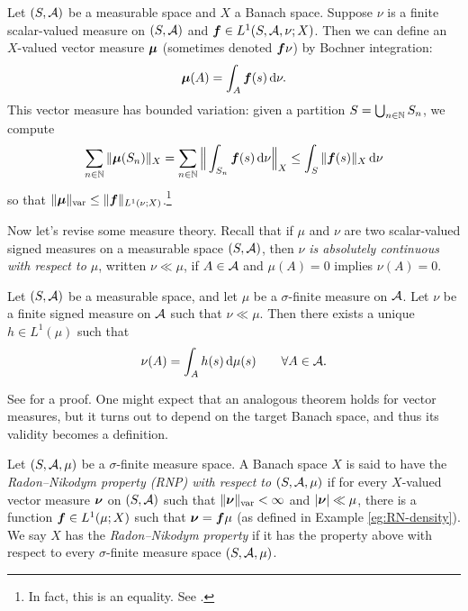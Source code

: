 \begin{example}\label{eg:RN-density}
  Let $(S,\mathcal{A})$ be a measurable space and $X$ a Banach space.
  Suppose $\nu$ is a finite scalar-valued measure on $(S,\mathcal{A})$ and $\bm{f} \in L^1(S,\mathcal{A},\nu;X)$.
  Then we can define an $X$-valued vector measure $\bm{\mu}$ (sometimes denoted $\bm{f}\nu$) by Bochner integration:
  \begin{equation*}
    \bm{\mu}(A) = \int_A \bm{f}(s) \, \mathrm{d}\nu.
  \end{equation*}
  This vector measure has bounded variation: given a partition $S = \bigcup_{n \in \mathbb{N}} S_n$, we compute
  \begin{equation*}
    \sum_{n \in \mathbb{N}} \|\bm{\mu}(S_n)\|_{X} = \sum_{n \in \mathbb{N}} \Big\| \int_{S_n} \bm{f}(s) \, \mathrm{d}\nu \Big\|_X
    \leq \int_{S} \|\bm{f}(s)\|_{X} \, \mathrm{d}\nu
  \end{equation*}
  so that $\|\bm{\mu}\|_{\mathrm{var}} \leq \|\bm{f}\|_{L^1(\nu;X)}$.\footnote{In fact, this is an equality. See \cite[pp43]{gP16}.}
\end{example}

Now let's revise some measure theory.
Recall that if $\mu$ and $\nu$ are two scalar-valued signed measures on a measurable space $(S,\mathcal{A})$, then \emph{$\nu$ is absolutely continuous with respect to $\mu$}, written $\nu \ll \mu$, if $A \in \mathcal{A}$ and $\mu(A) = 0$ implies $\nu(A) = 0$.

\begin{thm}
  Let $(S,\mathcal{A})$ be a measurable space, and let $\mu$ be a $\sigma$-finite measure on $\mathcal{A}$.
  Let $\nu$ be a finite signed measure on $\mathcal{A}$ such that $\nu \ll \mu$.
  Then there exists a unique $h \in L^1(\mu)$ such that
  \begin{equation*}
    \nu(A) = \int_{A} h(s) \, \mathrm{d}\mu(s) \qquad \forall A \in \mathcal{A}.
  \end{equation*}
\end{thm}

See \cite[Theorem 5.5.4]{rD04} for a proof.
One might expect that an analogous theorem holds for vector measures, but it turns out to depend on the target Banach space, and thus its validity becomes a definition.

\begin{defn}
  Let $(S,\mathcal{A},\mu)$ be a $\sigma$-finite measure space.
  A Banach space $X$ is said to have the \emph{Radon--Nikodym property (RNP) with respect to $(S,\mathcal{A},\mu)$} if for every $X$-valued vector measure $\bm{\nu}$ on $(S,\mathcal{A})$ such that $\|\bm{\nu}\|_{\mathrm{var}} < \infty$ and $|\bm{\nu}| \ll \mu$, there is a function $\bm{f} \in L^1(\mu;X)$ such that $\bm{\nu} = \bm{f}\mu$ (as defined in Example \ref{eg:RN-density}).
  We say $X$ has the \emph{Radon--Nikodym property} if it has the property above with respect to every $\sigma$-finite measure space $(S,\mathcal{A},\mu)$.
\end{defn}

